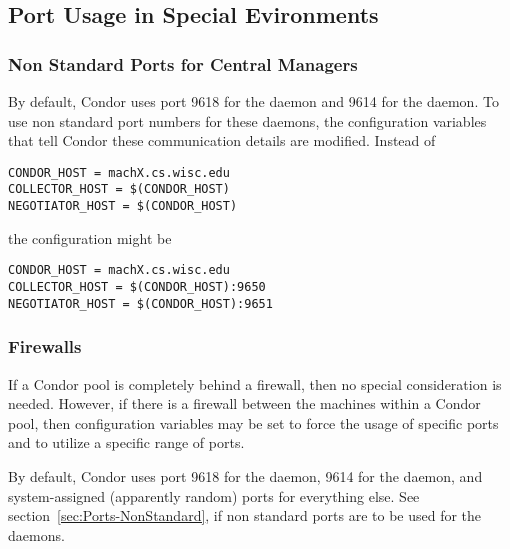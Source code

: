 \subsection{\label{sec:Port-Details}Port Usage in Special Evironments }


\subsubsection{\label{sec:Ports-NonStandard}Non Standard Ports for Central Managers}
By default,
Condor uses port 9618 for the  daemon
and 9614 for the  daemon.
To use non standard port numbers for these daemons,
the configuration variables that tell Condor these communication
details are modified.
Instead of
\begin{verbatim}
CONDOR_HOST = machX.cs.wisc.edu
COLLECTOR_HOST = $(CONDOR_HOST)
NEGOTIATOR_HOST = $(CONDOR_HOST)
\end{verbatim}
the configuration might be
\begin{verbatim}
CONDOR_HOST = machX.cs.wisc.edu
COLLECTOR_HOST = $(CONDOR_HOST):9650
NEGOTIATOR_HOST = $(CONDOR_HOST):9651
\end{verbatim}


\subsubsection{\label{sec:Ports-Firewalls}Firewalls}

If a Condor pool is completely behind a firewall,
then no special consideration is needed.
However, if there is a firewall between the machines within
a Condor pool, then
configuration variables may be set to force the usage of
specific ports and to utilize a specific range of ports.

By default,
Condor uses port 9618 for the  daemon,
9614 for the  daemon,
and system-assigned (apparently random) ports for everything else.
See section~\ref{sec:Ports-NonStandard},
if non standard ports are to be used for the
  daemons.

